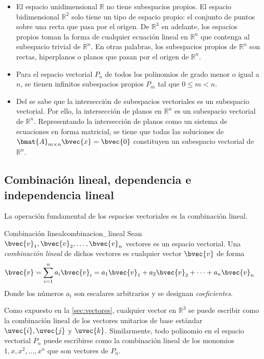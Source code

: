\documentclass{fmbnotes}
\begin{document}
\begin{itemize}
\item El espacio unidimensional \(\mathbb{R}\) no tiene subespacios propios. El espacio bidimensional \(\mathbb{R}^{2}\) solo tiene un tipo de espacio propio: el conjunto de puntos sobre una recta que pasa por el origen. De \(\mathbb{R}^{3}\) en adelante, los espacios propios toman la forma de cualquier ecuación lineal en \( \mathbb{R}^{n} \) que contenga al subespacio trivial de \( \mathbb{R}^{n} \). En otras palabras, los subespacios propios de \( \mathbb{R}^{n} \) son rectas, hiperplanos o planos que pasan por el origen de \( \mathbb{R}^{n} \).
\item Para el espacio vectorial \(P_n\) de todos los polinomios de grado menor o igual a \(n\), se tienen infinitos subespacios propios \(P_m\) tal que \(0 \leq m <n\).
\item Del  se sabe que la intersección de subespacios vectoriales es un subespacio vectorial. Por ello, la intersección de planos en \(\mathbb{R}^{n}\) es un subespacio vectorial de \(\mathbb{R}^{n}\). Representando la intersección de planos como un sistema de ecuaciones en forma matricial, se tiene que todas las soluciones de \(\bmat{A}_{m \times n}\bvec{x}=\bvec{0}\) constituyen un subespacio vectorial de \(\mathbb{R}^{n}\).
\end{itemize}

\subsection{Combinación lineal, dependencia e independencia lineal}
La operación fundamental de los espacios vectoriales es la combinación lineal.
\begin{definicion}{Combinación lineal}{combinacion_lineal}
Sean \(\bvec{v}_1,\bvec{v}_2,\ldots,\bvec{v}_n\) vectores es un espacio vectorial. Una \emph{combinación lineal} de dichos vectores es cualquier vector \( \bvec{v} \) de forma 
\[\bvec{v}=\sum_{i=1}^{n}a_i\bvec{v}_i=a_1\bvec{v}_1+a_2\bvec{v}_2+\cdots+a_n\bvec{v}_n \quad\]
Donde los números \(a_i\) son escalares arbitrarios y se designan \emph{coeficientes}.
\end{definicion}

Como expuesto en la \autoref{sec:vectores}, cualquier vector en \( \mathbb{R}^{3} \) se puede escribir como la combinación lineal de los vectores unitarios de base estándar \(\uvec{i}, \uvec{j}\) y \( \uvec{k} \). Similarmente, todo polinomio en el espacio vectorial \(P_n\) puede escribirse como la combinación lineal de los monomios \(1, x, x^2,\ldots,x^n\) que son vectores de \( P_n \).
\end{document}
